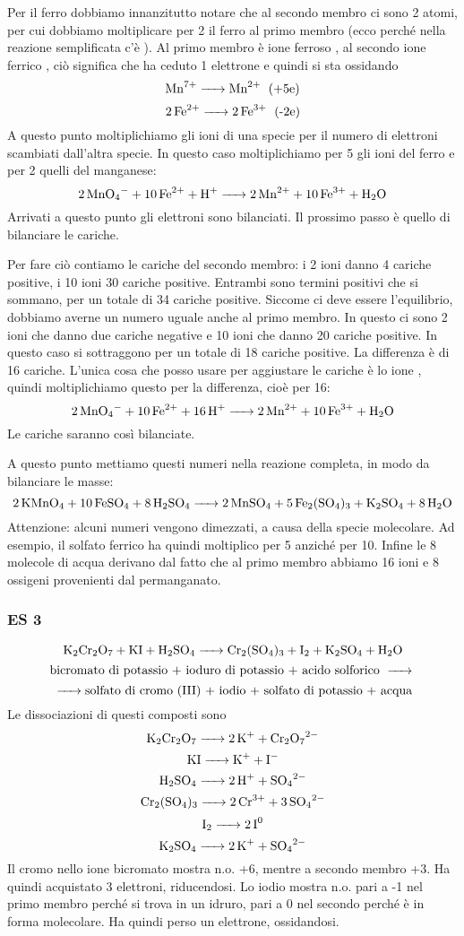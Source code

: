 Per il ferro dobbiamo innanzitutto notare che al secondo membro ci sono 2 atomi, per cui dobbiamo moltiplicare per 2 il ferro al primo membro (ecco perché nella reazione semplificata c'è ). Al primo membro è ione ferroso , al secondo ione ferrico , ciò significa che ha ceduto 1 elettrone e quindi si sta ossidando
$$\ce{Mn^7+ -> Mn^2+ \; \text{(+5e)}}$$
$$\ce{2Fe^2+ -> 2Fe^3+ \; \text{(-2e)}}$$
A questo punto moltiplichiamo gli ioni di una specie per il numero di elettroni scambiati dall'altra specie. In questo caso moltiplichiamo per 5 gli ioni del ferro e per 2 quelli del manganese:
$$\ce{2MnO_4- + 10Fe^2+ + H+ -> 2Mn^2+ + 10Fe^3+ + H_2O}$$
Arrivati a questo punto gli elettroni sono bilanciati. Il prossimo passo è quello di bilanciare le cariche.

Per fare ciò contiamo le cariche del secondo membro: i 2 ioni  danno 4 cariche positive, i 10 ioni  30 cariche positive. Entrambi sono termini positivi che si sommano, per un totale di 34 cariche positive. Siccome ci deve essere l'equilibrio, dobbiamo averne un numero uguale anche al primo membro. In questo ci sono 2 ioni  che danno due cariche negative e 10 ioni  che danno 20 cariche positive. In questo caso si sottraggono per un totale di 18 cariche positive. La differenza è di 16 cariche. L'unica cosa che posso usare per aggiustare le cariche è lo ione , quindi moltiplichiamo questo per la differenza, cioè per 16:
$$\ce{2MnO_4- + 10Fe^2+ + 16H+ -> 2Mn^2+ + 10Fe^3+ + H_2O}$$
Le cariche saranno così bilanciate.

A questo punto mettiamo questi numeri nella reazione completa, in modo da bilanciare le masse:
$$\ce{2KMnO_4 + 10FeSO_4 + 8H_2SO_4 -> 2MnSO_4 + 5Fe_2(SO_4)_3 + K_2SO_4 + 8H_2O}$$
Attenzione: alcuni numeri vengono dimezzati, a causa della specie molecolare. Ad esempio, il solfato ferrico ha  quindi moltiplico per 5 anziché per 10. Infine le 8 molecole di acqua derivano dal fatto che al primo membro abbiamo 16 ioni  e 8 ossigeni provenienti dal permanganato.\\
\subsubsection{\textbf{ES 3}}
$$\ce{K_2Cr_2O_7 + KI + H_2SO_4 -> Cr_2(SO_4)_3 + I_2 + K_2SO_4 + H_2O}$$
$$\text{bicromato di potassio + ioduro di potassio + acido solforico \ce{->}}$$
$${\ce{->} \text{solfato di cromo (III) +  iodio + solfato di potassio + acqua}}$$
Le dissociazioni di questi composti sono
$$\ce{K_2Cr_2O_7 -> 2K^+ + Cr_2O_7^2-}$$ 
$$\ce{KI -> K+ + I-}$$
$$\ce{H_2SO_4 -> 2H+ + SO_4^2-}$$
$$\ce{Cr_2(SO_4)_3 -> 2Cr^3+ + 3SO_4^2-}$$
$$\ce{I_2 -> 2I^0}$$
$$\ce{K_2SO_4 -> 2K+ + SO_4^2-}$$
Il cromo nello ione bicromato mostra n.o. +6, mentre a secondo membro +3. Ha quindi acquistato 3 elettroni, riducendosi.
Lo iodio mostra n.o. pari a -1 nel primo membro perché si trova in un idruro, pari a 0 nel secondo perché è in forma molecolare. Ha quindi perso un elettrone, ossidandosi. 

